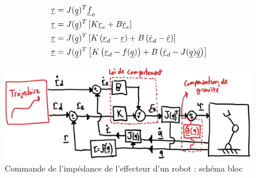 \begin{align}
\underline{\tau} &= J(\underline{q})^T \underline{f}_e \\
\underline{\tau} &= J(\underline{q})^T   \left[ K \underline{r}_e + B \underline{\dot{r}}_e \right] \\
\underline{\tau} &= J(\underline{q})^T  \left[ K  \left( \underline{r}_d- \underline{r} \right) + B  \left( \underline{\dot{r}}_d - \underline{\dot{r}} \right)  \right] \\
\underline{\tau} &= J(\underline{q})^T  \left[ K  \left( \underline{r}_d- f(\underline{q}) \right) + B  \left( \underline{\dot{r}}_d - J(\underline{q}) \underline{\dot{q}} \right)  \right] 
\end{align}
\begin{figure}[th]
	\centering
		\includegraphics[width=0.99\textwidth]{fig/impedanceeffectorbloc.jpg}
	\caption{Commande de l'impédance de l'effecteur d'un robot : schéma bloc}
	\label{fig:impedanceeffectorbloc}
\end{figure}

